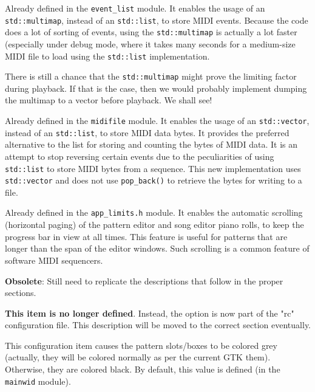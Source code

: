         Already defined in the \texttt{event\_list} module.
        It enables the usage of an
        \texttt{std::multimap}, instead of an \texttt{std::list},
        to store MIDI events.  Because
        the code does a lot of sorting of events, using the
        \texttt{std::multimap} is actually a lot faster (especially under debug
        mode, where it takes
        many seconds for a medium-size MIDI file to load using the
        \texttt{std::list} implementation.

        There is still a chance that the \texttt{std::multimap} might prove the
        limiting factor during playback.  If that is the case, then we would
        probably implement dumping the multimap to a vector before playback.
        We shall see!

        Already defined in the \texttt{midifile} module.
        It enables the usage of an
        \texttt{std::vector}, instead of an \texttt{std::list},
        to store MIDI data bytes.
        It provides the preferred alternative to the list for storing and
        counting the bytes of MIDI data.  It is an attempt to stop reversing
        certain events due to the peculiarities of using \texttt{std::list} to
        store MIDI bytes from a sequence.  This new implementation uses
        \texttt{std::vector} and does not use \texttt{pop\_back()} to retrieve
        the bytes for writing to a file.

        Already defined in the \texttt{app\_limits.h} module.
        It enables the automatic scrolling (horizontal paging) of the pattern
        editor and song editor piano rolls, to keep the progress bar in view at
        all times.  This feature is useful for patterns that are longer than
        the span of the editor windows.  Such scrolling is a common
        feature of software MIDI sequencers.

   \textbf{Obsolete}:  Still need to replicate the descriptions that follow
      in the proper sections.

        \textbf{This item is no longer defined}.
        Instead, the option is now part of the "rc" configuration file.  This
        description will be moved to the correct section eventually.

        This configuration item causes the pattern slots/boxes to be colored
        grey (actually, they will be colored normally as per the current GTK
        them).  Otherwise, they are colored black.  By default, this value is
        defined (in the \texttt{mainwid} module).

